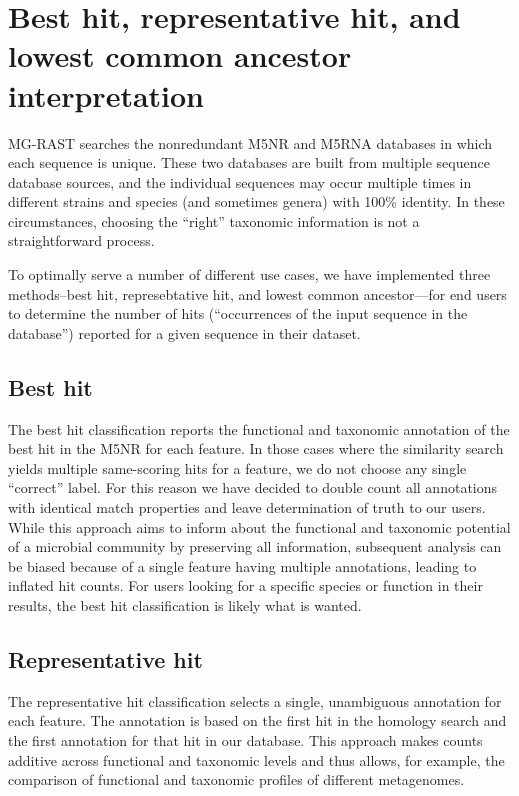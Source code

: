 \documentclass[12pt,fullpage]{report}
\begin{document}
\section{Best hit, representative hit, and lowest common ancestor interpretation}
\label{section:hit-types}

MG-RAST searches the nonredundant M5NR and M5RNA databases in which each sequence is unique. These two databases are built from multiple sequence database sources, and the individual sequences may occur multiple times in different strains and species (and sometimes genera) with 100\% identity. In these circumstances, choosing the ``right” taxonomic information is not a straightforward process.

To optimally serve a number of different use cases, we have implemented three methods--best hit, represebtative hit, and lowest common ancestor---for 
end users to determine the number of hits
(``occurrences of the input sequence in the database”)
reported for a given sequence in their dataset.
\subsection{Best hit}

The best hit classification reports the functional and taxonomic annotation of the best hit in the M5NR for each feature. In those cases where the similarity search yields multiple same-scoring hits for a feature, we do not choose any single ``correct” label. For this reason we have decided to double count all annotations with identical match properties and leave determination of truth to our users. While this approach aims to inform about the functional and taxonomic potential of a microbial community by preserving all information, subsequent analysis can be biased because of a single feature having multiple annotations, leading to inflated hit counts. For users looking for a specific species or function in their results, the best hit classification is likely what is wanted.
\subsection{Representative hit}

The representative hit classification selects a single, unambiguous annotation for each feature. The annotation is based on the first hit in the homology search and the first annotation for that hit in our database. This approach makes counts additive across functional and taxonomic levels and thus allows, for example, the comparison of functional and taxonomic profiles of different metagenomes.
\end{document}
